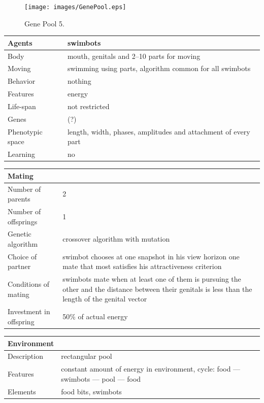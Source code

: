 \documentclass[a4paper,12pt]{report}
\begin{document}
\begin{figure}
\begin{center}
  \texttt{[image: images/GenePool.eps]}
  \caption{Gene Pool 5.}
  \label{img.GenePool}
\end{center}
\end{figure}
  
\vspace{20pt}
\begin{tabular}{|p{150pt}|p{220pt}|}
\hline
\textbf{Agents}&swimbots\\ \hline
Body&mouth, genitals and 2--10 parts for moving\\ \hline
Moving&swimming using parts, algorithm common for all swimbots\\ \hline
Behavior&nothing\\ \hline
Features&energy\\ \hline
Life-span&not restricted\\ \hline
Genes&(?)\\ \hline
Phenotypic space&length, width, phases, amplitudes and attachment of every part\\ \hline
Learning&no\\ \hline
\end{tabular} 

\vspace{10pt}
\begin{tabular}{|p{150pt}|p{220pt}|} \hline \textbf{Mating}&\\ \hline
Number of parents&2\\ \hline
Number of offsprings&1\\ \hline
Genetic algorithm&crossover algorithm with mutation\\ \hline
Choice of partner&swimbot chooses at one snapshot in his view horizon one mate that most satisfies his attractiveness criterion\\ \hline
Conditions of mating&swimbots mate when at least one of them is pursuing the other and the distance between their genitals is less than the length of the genital vector\\ \hline
Investment in offspring&50\% of actual energy\\ \hline
\end{tabular} 

\vspace{10pt}
\begin{tabular}{|p{150pt}|p{220pt}|} \hline \textbf{Environment}&\\ \hline
Description&rectangular pool\\ \hline
Features&constant amount of energy in environment, cycle: food --- swimbots --- pool --- food\\ \hline
Elements&food bits, swimbots\\ \hline
\end{tabular} 
\end{document}
